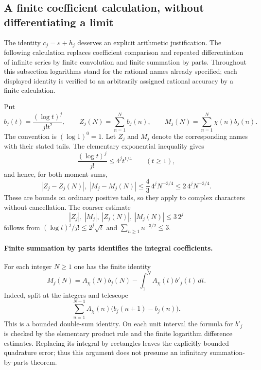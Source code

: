 \subsection{A finite coefficient calculation, without differentiating a limit}
\label{sec:finite-jet-closure}

The identity $c_j=\varepsilon+h_j$ deserves an explicit arithmetic
justification.  The following calculation replaces coefficient comparison
and repeated differentiation of infinite series by finite convolution and
finite summation by parts.  Throughout this subsection logarithms stand for
the rational names already specified; each displayed identity is verified
to an arbitrarily assigned rational accuracy by a finite calculation.

Put
\[
 b_j(t)=\frac{(\log t)^j}{j!t^2},\qquad
 Z_j(N)=\sum_{n=1}^N b_j(n),\qquad
 M_j(N)=\sum_{n=1}^N\chi(n)b_j(n).
\]
The convention is $(\log1)^0=1$.  Let $Z_j$ and $M_j$ denote the corresponding
names with their stated tails.  The elementary exponential inequality gives
\[
 \frac{(\log t)^j}{j!}\leq4^j t^{1/4}\qquad(t\geq1),
\]
and hence, for both moment sums,
\begin{equation}
 |Z_j-Z_j(N)|,\ |M_j-M_j(N)|
       \leq\frac43\,4^jN^{-3/4}
       \leq2\,4^jN^{-3/4}.
 \label{eq:moment-series-tail}
\end{equation}
These are bounds on ordinary positive tails, so they apply to complex
characters without cancellation.  The coarser estimate
\[
 |Z_j|,\ |M_j|,\ |Z_j(N)|,\ |M_j(N)|\leq3\,2^j
\]
follows from $(\log t)^j/j!\leq2^j\sqrt t$ and
$\sum_{n\geq1}n^{-3/2}\leq3$.

\paragraph{Finite summation by parts identifies the integral coefficients.}
For each integer $N\geq1$ one has the finite identity
\begin{equation}
 M_j(N)=A_\chi(N)b_j(N)-\int_1^N A_\chi(t)b'_j(t)\,dt.
 \label{eq:finite-jet-partial-summation}
\end{equation}
Indeed, split at the integers and telescope
\[
 \sum_{n=1}^{N-1}A_\chi(n)\bigl(b_j(n+1)-b_j(n)\bigr).
\]
This is a bounded double-sum identity.  On each unit interval the formula
for $b'_j$ is checked by the elementary product rule and the finite
logarithm difference estimates.  Replacing its integral by rectangles
leaves the explicitly bounded quadrature error; thus this argument does
not presume an infinitary summation-by-parts theorem.


